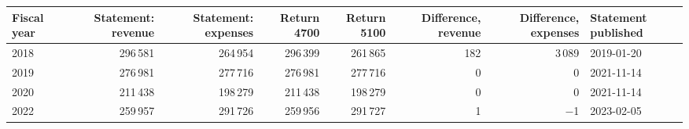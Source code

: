\begin{tabular}{@{}lrrrrrrl@{}}\toprule
Fiscal year & Statement: revenue & Statement: expenses & Return 4700 & Return 5100 & Difference, revenue & Difference, expenses & Statement published \\\midrule
2018 & 296\,581 & 264\,954 & 296\,399 & 261\,865 & 182 & 3\,089 & 2019-01-20 \\
2019 & 276\,981 & 277\,716 & 276\,981 & 277\,716 & 0 & 0 & 2021-11-14 \\
2020 & 211\,438 & 198\,279 & 211\,438 & 198\,279 & 0 & 0 & 2021-11-14 \\
2022 & 259\,957 & 291\,726 & 259\,956 & 291\,727 & 1 & $-$1 & 2023-02-05 \\
\bottomrule\end{tabular}
